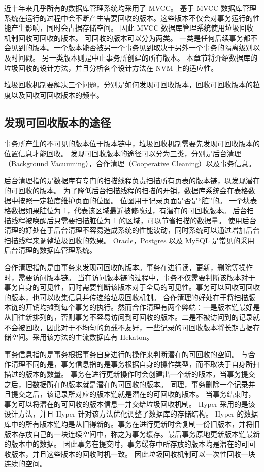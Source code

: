 近十年来几乎所有的数据库管理系统均采用了 MVCC。
基于 MVCC 数据库管理系统在运行的过程中会不断产生需要回收的版本。这些版本不仅会对事务运行的性能产生影响，同时会占据存储空间。
因此 MVCC 数据库管理系统使用垃圾回收机制回收可回收的版本。
可回收的版本可以分为两类。
一类是任何后续事务都不会见到的版本。一个版本能否被另一个事务见到取决于另外一个事务的隔离级别以及时间戳。
另一类版本则是中止事务所创建的所有版本。
本章节将介绍数据库的垃圾回收的设计方法，并且分析各个设计方法在 NVM 上的适应性。

垃圾回收机制要解决三个问题，分别是如何发现可回收版本，回收可回收版本的粒度以及回收可回收版本的频率。

\subsection{发现可回收版本的途径}

事务所产生的不可见的版本位于版本链中，垃圾回收机制需要先发现可回收版本的位置信息才能回收。
发现可回收版本的途径可以分为三类，分别是后台清理（Background Vacuuming），合作清理（Cooperative Cleaning）以及事务信息。

后台清理指的是数据库有专门的扫描线程负责扫描所有页表的版本链，以发现潜在的可回收的版本。
为了降低后台扫描线程的扫描的开销，数据库系统会在表格数据中按照一定粒度维护页面的位图。
位图用于记录页面是否是“脏”的。
一个块表格数据如果脏位为 1，代表该区域最近被修改过，有潜在的可回收版本。
后台扫描线程被唤醒后只需要扫描脏位为 1 的区域，可以节省扫描的数据量。
使用后台清理的好处在于后台清理不容易造成系统的性能波动，同时系统可以通过增加后台扫描线程来调整垃圾回收的效果。
Oracle\cite{oracle}，Postgres\cite{pg} 以及 MySQL\cite{mysql} 是常见的采用后台清理的数据库管理系统。

合作清理指的是由事务来发现可回收的版本。事务在进行读，更新，删除等操作时，需要访问版本链。
当在访问版本链的过程中，事务不仅需要判断该版本对于事务自身的可见性，同时需要判断该版本对于全局的可见性。事务可以回收可回收的版本，也可以收集信息并传递给垃圾回收机制。
合作清理的好处在于将扫描版本链的开销均摊到每个事务的执行。然而合作清理有两个弊端：一是版本链最好是从旧往新排列的，否则事务不容易访问到可回收的版本。二是不被访问到的记录就不会被回收，因此对于不均匀的负载不友好，一些记录的可回收版本将长期占据存储空间。采用该方法的主流数据库有 Hekaton\cite{hekaton}。

事务信息指的是事务根据事务自身进行的操作来判断潜在的可回收的空间。
与合作清理不同的是，事务信息指的是事务根据自身的操作类型，而不取决于自身所扫描过的版本的数量。
事务在进行更新操作时会创建出一个新的版本，当事务提交之后，旧数据所在的版本就是潜在的可回收的版本。
同理，事务删除一个记录并且提交之后，该记录所对应的版本链就是潜在的可回收的版本。
当事务结束时，事务可以将潜在的可回收的版本信息一并交给垃圾回收机制。
Hyper\cite{hyper} 采用的是该设计方法，并且 Hyper 针对该方法优化调整了数据库的存储结构。
Hyper 的数据库中的所有版本链均是从旧得新的。事务在进行更新时会复制一份旧版本，并将旧版本存放自己的一块连续空间中，称之为事务缓存。最后事务原地更新版本链最新的版本中的数据。
因此事务在提交时，事务缓存中所存放的版本均是潜在的可回收版本，并且这些版本的回收时机一致。
因此垃圾回收机制可以一次性回收一块连续的空间。

